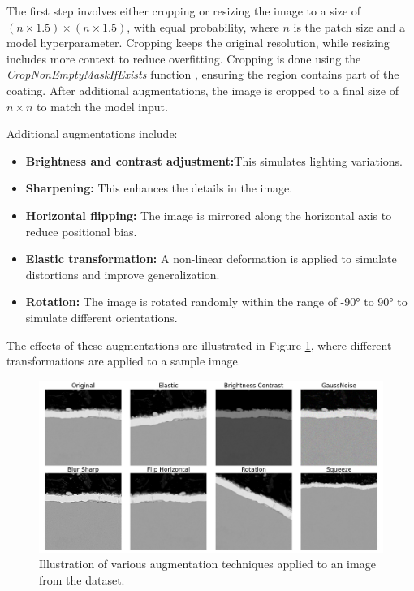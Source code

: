 The first step involves either cropping or resizing the image to a size of $(n \times 1.5) \times (n \times 1.5)$, with equal probability, where $n$ is the patch size and a model hyperparameter. Cropping keeps the original resolution, while resizing includes more context to reduce overfitting. Cropping is done using the \textit{CropNonEmptyMaskIfExists} function \cite{info11020125}, ensuring the region contains part of the coating. After additional augmentations, the image is cropped to a final size of $n \times n$ to match the model input.

Additional augmentations include:

\begin{itemize}
    \item \textbf{Brightness and contrast adjustment:}This simulates lighting variations.
    \item \textbf{Sharpening:} This enhances the details in the image.
    \item \textbf{Horizontal flipping:} The image is mirrored along the horizontal axis to reduce positional bias.
    \item \textbf{Elastic transformation:} A non-linear deformation is applied to simulate distortions and improve generalization.
    \item \textbf{Rotation:} The image is rotated randomly within the range of -90° to 90° to simulate different orientations.
\end{itemize}

The effects of these augmentations are illustrated in Figure \ref{fig:augmentation}, where different transformations are applied to a sample image.

\begin{figure}[H]
\centering
\includegraphics[width=1\linewidth]{PICTURES/augumentation.png}
\caption{Illustration of various augmentation techniques applied to an image from the dataset.}
\label{fig:augmentation}
\end{figure}

